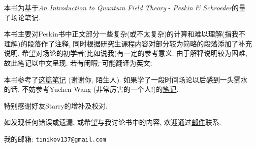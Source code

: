 
\begin{spacing}{1.8}
  本书为基于\textit{An Introduction to Quantum Field Theory} - \textit{Peskin \& Schroeder}的量子场论笔记.

  \mbox{}

  本书主要对Peskin书中正文部分一些复杂(或不太复杂)的计算和难以理解(指我不理解)的段落作了注释, 同时根据研究生课程内容对部分较为简略的段落添加了补充说明, 希望对场论的初学者(比如说我)有一定的参考意义.
  由于解释说明较为困难, 故此笔记以中文呈现.
  \sout{若有闲暇, 可能翻译为英文. }

  \mbox{}

  本书参考了\href{http://gamebm.shoutwiki.com/wiki/Lecture_Notes_of_An_Introduction_to_Quantum_Field_Theory_by_M._Peskin_and_D._Schroeder}{这篇笔记} (谢谢你, 陌生人).
  如果学了一段时间场论以后感到一头雾水的话, 不妨参考Yuchen Wang (非常厉害的一个人!)的\href{https://zhuanlan.zhihu.com/p/391450897}{笔记}.

  特别感谢好友Starry的增补及校对.

  \mbox{}

  如发现任何错误或遗漏, 或希望与我讨论书中的内容, 欢迎通过\href{mailto:tinikov137@gmail.com}{邮件}联系.

  我的邮箱: \texttt{tinikov137@gmail.com}
\end{spacing}
\pagestyle{general}